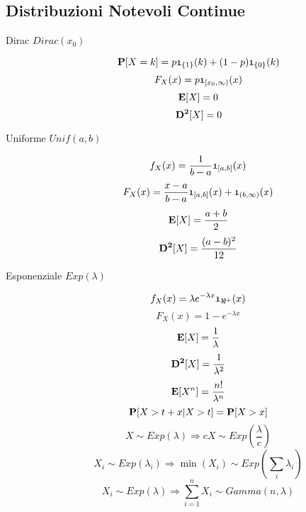 \subsection{Distribuzioni Notevoli Continue}
\begin{description}
	
	\item[Dirac $Dirac(x_{0})$]
		\begin{equation}
		\mathbf{P}[X=k] = p\mathfrak{1}_{\{1\}}(k)+(1-p)\mathfrak{1}_{\{0\}}(k)
		\end{equation}
		\begin{equation}
		F_{X}(x)=p\mathfrak{1}_{[x_{0},\infty)}(x)
		\end{equation}
		\begin{equation}
		\mathbf{E}[X]=0
		\end{equation}
		\begin{equation}
		\mathbf{D^{2}}[X]=0
		\end{equation}
	
	\item[Uniforme $Unif(a,b)$]
		\begin{equation}
		f_{X}(x)=\frac{1}{b-a}\mathfrak{1}_{[a,b]}(x)
		\end{equation}
		\begin{equation}
		F_{X}(x)=\frac{x-a}{b-a}\mathfrak{1}_{[a,b]}(x)+\mathfrak{1}_{(b,\infty)}(x)
		\end{equation}
		\begin{equation}
		\mathbf{E}[X]=\frac{a+b}{2}
		\end{equation}
		\begin{equation}
		\mathbf{D^{2}}[X]=\frac{(a-b)^{2}}{12}
		\end{equation}
		
	\item[Esponenziale $Exp(\lambda)$]
		\begin{equation}
		f_{X}(x)=\lambda e^{-\lambda x} \mathfrak{1}_{\Re^{+}}(x)
		\end{equation}
		\begin{equation}
		F_{X}(x)=1-e^{-\lambda x}
		\end{equation}
		\begin{equation}
		\mathbf{E}[X]=\frac{1}{\lambda}
		\end{equation}
		\begin{equation}
		\mathbf{D^{2}}[X]=\frac{1}{\lambda^{2}}
		\end{equation}
		\begin{equation}
		\mathbf{E}[X^{n}]=\frac{n!}{\lambda^{n}}
		\end{equation}
		\begin{equation}
		\mathbf{P}[X>t+x|X>t]=\mathbf{P}[X>x]
		\end{equation}
		\begin{equation}
		X\sim Exp(\lambda)\Rightarrow cX\sim Exp(\frac{\lambda}{c})
		\end{equation}
		\begin{equation}
		X_{i}\sim Exp(\lambda_{i})\Rightarrow \min(X_{i})\sim Exp(\sum_{i}\lambda_{i})
		\end{equation}
		\begin{equation}
		X_{i}\sim Exp(\lambda)\Rightarrow \sum_{i=1}^{n}X_{i}\sim Gamma(n,\lambda)
		\end{equation}		


\end{description}

